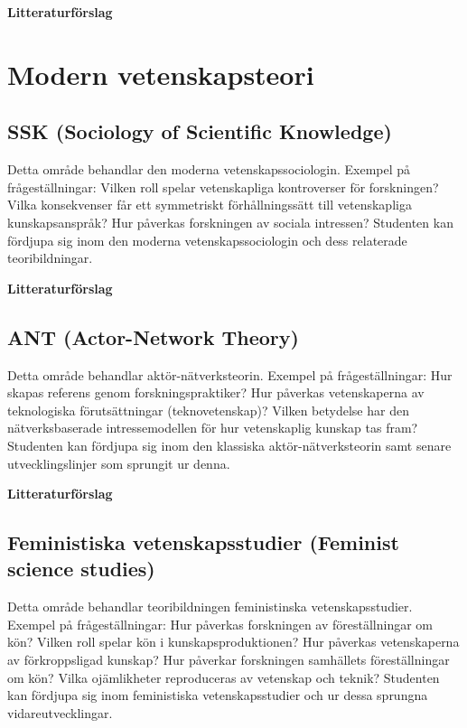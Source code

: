 \documentclass[12pt,a4paper]{article}
\begin{document}
\noindent \textbf{Litteraturförslag}

 
 
 
  


\section{Modern vetenskapsteori}

\subsection{SSK (Sociology of Scientific Knowledge)}
Detta område behandlar den moderna vetenskapssociologin. Exempel på frågeställningar: Vilken roll spelar vetenskapliga kontroverser för forskningen? Vilka konsekvenser får ett symmetriskt förhållningssätt till vetenskapliga kunskapsanspråk? Hur påverkas forskningen av sociala intressen? Studenten kan fördjupa sig inom den moderna vetenskapssociologin och dess relaterade teoribildningar.


\noindent \textbf{Litteraturförslag}

 \fullcite{}
 
 \fullcite{}
  
 \fullcite{}
 
\subsection{ANT (Actor-Network Theory)}
Detta område behandlar aktör-nätverksteorin. Exempel på frågeställningar: Hur skapas referens genom forskningspraktiker? Hur påverkas vetenskaperna av teknologiska förutsättningar (teknovetenskap)? Vilken betydelse har den nätverksbaserade intressemodellen för hur vetenskaplig kunskap tas fram? Studenten kan fördjupa sig inom den klassiska aktör-nätverksteorin samt senare utvecklingslinjer som  sprungit ur denna.  


\noindent \textbf{Litteraturförslag}

 \fullcite{}
 
 \fullcite{}
  
 \fullcite{}
 
\subsection{Feministiska vetenskapsstudier (Feminist science studies)}
Detta område behandlar teoribildningen feministinska vetenskapsstudier. Exempel på frågeställningar: Hur påverkas forskningen av föreställningar om kön? Vilken roll spelar kön i kunskapsproduktionen? Hur påverkas vetenskaperna av förkroppsligad kunskap? Hur påverkar forskningen samhällets föreställningar om kön? Vilka ojämlikheter reproduceras av vetenskap och teknik? Studenten kan fördjupa sig inom feministiska vetenskapsstudier och ur dessa sprungna vidareutvecklingar. 
\end{document}

